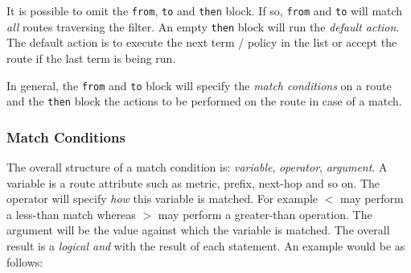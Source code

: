 \noindent{}

It is possible to omit the {\tt from}, {\tt to} and {\tt then} block.  If so,
{\tt from} and {\tt to} will match {\em all} routes traversing the filter.  An
empty {\tt then} block will run the {\em default action}.  The default action is
to execute the next term / policy in the list or accept the route if the last
term is being run.

In general, the {\tt from} and {\tt to} block will specify the {\em match
conditions} on a route and the {\tt then} block the actions to be performed on
the route in case of a match.

\subsubsection{Match Conditions}
The overall structure of a match condition is: {\em variable}, {\em operator},
{\em argument}.  A variable is a route attribute such as metric, prefix,
next-hop and so on.  The operator will specify {\em how} this variable is
matched.  For example {\tt $<$} may perform a less-than match whereas {\tt $>$}
may perform a greater-than operation.  The argument will be the value against
which the variable is matched.  The overall result is a {\em logical and} with
the result of each statement. An example would be as follows:

\noindent{}

